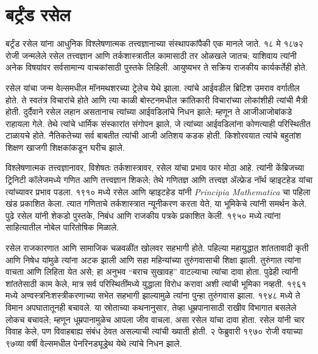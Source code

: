 \section{बर्ट्रंड रसेल}\label{his:bio:rus:sec}



बर्ट्रंड रसेल यांना आधुनिक विश्लेषणात्मक तत्त्वज्ञानाच्या संस्थापकांपैकी एक मानले जाते. १८ मे १८७२ रोजी जन्मलेले रसेल तत्त्वज्ञान आणि तर्कशास्त्रातील कामासाठी तर ओळखले जातच; याशिवाय त्यांनी अनेक विषयांवर सर्वसामान्य वाचकांसाठी पुस्तके लिहिली. आयुष्यभर ते सक्रिय राजकीय कार्यकर्तेही होते.

रसेल यांचा जन्म वेल्समधील मॉनमथशरच्या ट्रेलेच येथे झाला. त्यांचे आईवडील ब्रिटिश उमराव वर्गातील होते. ते स्वतंत्र विचारांचे होते आणि त्या काळी बोस्टनमधील क्रांतिकारी विचारांच्या लोकांशीही त्यांची मैत्री होती. दुर्दैवाने रसेल लहान असतानाच त्यांच्या आईवडिलांचे निधन झाले; म्हणून ते आजीआजोबांकडे राहायला गेले. तेथे त्यांचे धार्मिक संस्कारांत संगोपन झाले, जे त्यांच्या आईवडिलांना कोणत्याही परिस्थितीत टाळायचे होते. नैतिकतेच्या सर्व बाबतीत त्यांची आजी अतिशय कडक होती. किशोरवयात त्यांचे बहुतांश शिक्षण खाजगी शिक्षकांकडून घरीच झाले.

विश्लेषणात्मक तत्त्वज्ञानावर, विशेषतः तर्कशास्त्रावर, रसेल यांचा प्रभाव फार मोठा आहे. त्यांनी केंब्रिजच्या ट्रिनिटी कॉलेजमध्ये गणित आणि तत्त्वज्ञान शिकले; तेथे गणितज्ञ आणि तत्त्वज्ञ ॲल्फ्रेड नॉर्थ व्हाइटहेड यांचा त्यांच्यावर प्रभाव पडला. १९१० मध्ये रसेल आणि व्हाइटहेड यांनी \emph{Principia Mathematica} चा पहिला खंड प्रकाशित केला. त्यात गणिताचे तर्कशास्त्रात न्यूनीकरण करता येते, या भूमिकेचे त्यांनी समर्थन केले. पुढे रसेल यांनी शेकडो पुस्तके, निबंध आणि राजकीय पत्रके प्रकाशित केली. १९५० मध्ये त्यांना साहित्यातील नोबेल पारितोषिक मिळाले.

रसेल राजकारणात आणि सामाजिक चळवळींत खोलवर सहभागी होते. पहिल्या महायुद्धात शांततावादी कृती आणि निषेध यांमुळे त्यांना अटक झाली आणि सहा महिन्यांच्या तुरुंगवासाची शिक्षा झाली. तुरुंगात त्यांना वाचता आणि लिहिता येत असे; हा अनुभव “बराच सुखावह” वाटल्याचा त्यांचा दावा होता. पुढेही त्यांनी शांततेसाठी काम केले, मात्र सर्व परिस्थितींमध्ये युद्धाला विरोध करावा अशी त्यांची भूमिका नव्हती. १९६१ मध्ये अण्वस्त्रनिःशस्त्रीकरणाच्या सभेत सहभागी झाल्यामुळे त्यांना पुन्हा तुरुंगवास झाला. १९४८ मध्ये ते विमान अपघातातूनही बचावले. या स्रोताच्या कथनानुसार, तेव्हा धूम्रपानासाठी राखीव विभागात बसलेले लोकच बचावले; म्हणून धूम्रपानामुळेच आपला जीव वाचला, असा रसेल यांचा दावा होता. रसेल यांनी चार विवाह केले, पण विवाहबाह्य संबंध ठेवत असल्याची त्यांची ख्याती होती. २ फेब्रुवारी १९७० रोजी वयाच्या ९७व्या वर्षी वेल्समधील पेनरिनड्यूड्रेथ येथे त्यांचे निधन झाले.

